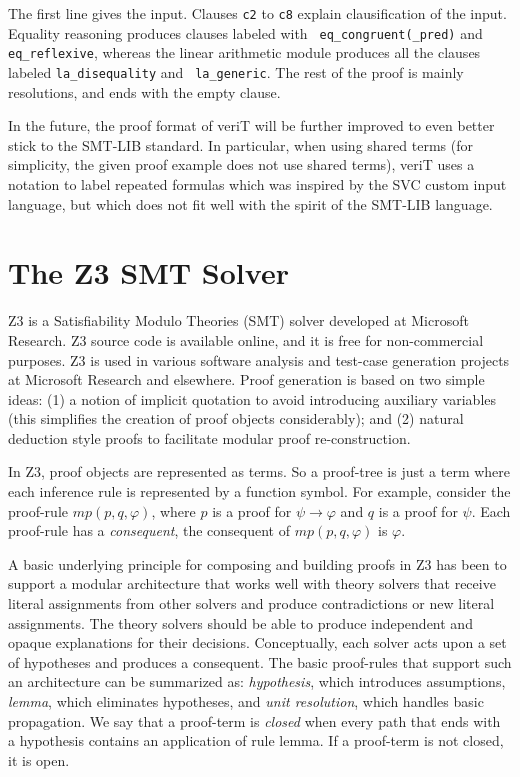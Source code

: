 \documentclass{llncs}
\begin{document}
The first line gives the input.  Clauses {\tt c2} to {\tt c8} explain clausification
of the input.  Equality reasoning produces clauses labeled with {\tt
  eq\_congruent(\_pred)} and {\tt eq\_reflexive}, whereas the linear arithmetic
module produces all the clauses labeled {\tt la\_disequality} and {\tt
  la\_generic}.  The rest of the proof is mainly resolutions, and ends with the
empty clause.


In the future, the proof format of veriT will be further improved to even better
stick to the SMT-LIB standard.  In particular, when using shared terms (for
simplicity, the given proof example does not use shared terms), veriT uses a
notation to label repeated formulas which was inspired by the SVC custom input
language, but which does not fit well with the spirit of the SMT-LIB language.

\section{The Z3 SMT Solver}
\label{sec:z3}

Z3 is a Satisfiability Modulo Theories (SMT) solver developed at
Microsoft Research.  Z3 source code is available online, and it is
free for non-commercial purposes.  Z3 is used in various software
analysis and test-case generation projects at Microsoft Research and
elsewhere.  Proof generation is based on two simple ideas: (1) a
notion of implicit quotation to avoid introducing auxiliary variables
(this simplifies the creation of proof objects considerably); and (2) natural
deduction style proofs to facilitate modular proof re-construction.


In Z3, proof objects are represented as terms. So a proof-tree is just a term
where each inference rule is represented by a function symbol.
For example, consider the proof-rule $mp(p, q, \varphi)$, where $p$ is a proof for
$\psi \rightarrow \varphi$ and $q$ is a proof for $\psi$. Each proof-rule has a
\emph{consequent}, the consequent of $mp(p, q, \varphi)$ is $\varphi$.

A basic underlying principle for composing and building proofs in Z3 has been to support a modular
architecture that works well with theory solvers that receive literal assignments from other solvers and
produce contradictions or new literal assignments. The theory solvers should be able to produce independent
and opaque explanations for their decisions.
Conceptually, each solver acts upon a set of hypotheses and produces a consequent. The basic proof-rules
that support such an architecture can be summarized as: \emph{hypothesis},
which introduces assumptions, \emph{lemma}, which eliminates hypotheses, and \emph{unit resolution}, which handles basic propagation.
We say that a proof-term is \emph{closed} when every path that ends with a hypothesis contains an application
of rule lemma. If a proof-term is not closed, it is open.
\end{document}
